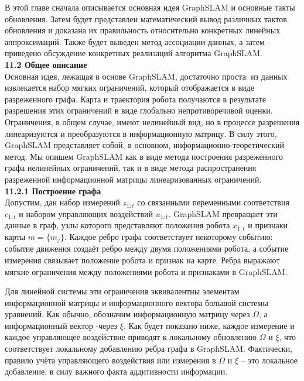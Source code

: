 \documentclass[10pt,a4paper]{article}
\begin{document}
В этой главе сначала описывается основная идея GraphSLAM и основные такты обновления. Затем будет представлен математический вывод различных тактов обновления и доказана их правильность относительно конкретных линейных аппроксимаций. Также будет выведен метод ассоциации данных, а затем – приведено обсуждение конкретных реализаций алгоритма GraphSLAM.\\

\textbf{11.2	Общее описание}\\

Основная идея, лежащая в основе GraphSLAM, достаточно проста: из данных извлекается  набор мягких ограничений, который отображается в виде разреженного графа. Карта и траектория робота получаются в результате разрешения этих ограничений в виде глобально непротиворечивой оценки. Ограничения, в общем случае, имеют нелинейный вид, но в процессе разрешения линеаризуются и преобразуются в информационную матрицу. В силу этого, GraphSLAM представляет собой, в основном, информационно-теоретический метод. Мы опишем GraphSLAM как в виде метода построения разреженного графа нелинейных ограничений, так и в виде метода распространения разреженной информационной матрицы линеаризованных ограничений.\\

\textbf{11.2.1	Построение графа}\\

Допустим, дан набор измерений $z_{1:t}$ со связанными переменными соответствия $c_{1:t}$ и набором управляющих воздействий $u_{1:t}$. GraphSLAM превращает эти данные в граф, узлы которого представляют положения робота $x_{1:t}$ и признаки карты $m = \{m_j\}$. Каждое ребро графа соответствует некоторому событию: событие движения создаёт ребро между двумя положениями робота, а событие измерения связывает положение робота и признак на карте. Ребра выражают мягкие ограничения между положениями робота и признаками в GraphSLAM.

Для линейной системы эти ограничения эквивалентны элементам информационной матрицы и информационного вектора большой системы уравнений. Как обычно, обозначим информационную матрицу через $\varOmega$, а информационный вектор -через $\xi$. Как будет показано ниже, каждое измерение и каждое управляющее воздействие приводят к локальному обновлению $\varOmega$ и $\xi$, что соответствует локальному добавлению ребра графа в GraphSLAM. Фактически, правило учёта управляющего воздействия или измерения в $\varOmega$ и $\xi$ – это локальное добавление, в силу важного факта аддитивности информации. 
\end{document}
